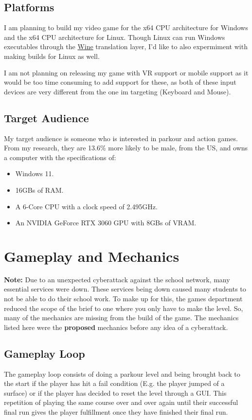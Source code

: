 \documentclass[12pt]{article}
\begin{document}
	\subsection{Platforms}
	I am planning to build my video game for the x64 CPU architecture for Windows and the x64 CPU architecture for Linux. Though Linux can run Windows executables through the \href{https://www.winehq.org}{Wine} translation layer, I'd like to also expermiment with making builds for Linux as well.
	
	I am not planning on releasing my game with VR support or mobile support as it would be too time consuming to add support for these, as both of these input devices are very different from the one im targeting (Keyboard and Mouse).
	
	\newpage
	\subsection{Target Audience}
	My target audience is someone who is interested in parkour and action games. From my research, they are 13.6\% more likely to be male, \cite{gameTreeIndustryReports} from the US, \cite{gameDiscoverCoCountryBreakdown} and owns a computer with the specifications of:
	\begin{itemize}
		\item Windows 11.
		\item 16GBs of RAM.
		\item A 6-Core CPU with a clock speed of 2.495GHz.
		\item An NVIDIA GeForce RTX 3060 GPU with 8GBs of VRAM.
	\end{itemize} \cite{steamHardwareSurvey}
	
	\section{Gameplay and Mechanics}
	\begin{note}
		\textbf{Note:} Due to an unexpected cyberattack against the school network, many essential services were down. These services being down caused many students to not be able to do their school work. To make up for this, the games department reduced the scope of the brief to one where you only have to make the level. So, many of the mechanics are missing from the build of the game. The mechanics listed here were the \textbf{proposed} mechanics before any idea of a cyberattack.
	\end{note}
	\subsection{Gameplay Loop}
	The gameplay loop consists of doing a parkour level and being brought back to the start if the player has hit a fail condition (E.g. the player jumped of a surface) or if the player has decided to reset the level through a GUI. This repetition of playing the same course over and over again until their successful final run gives the player fulfillment once they have finished their final run.
	\newpage
\end{document}
